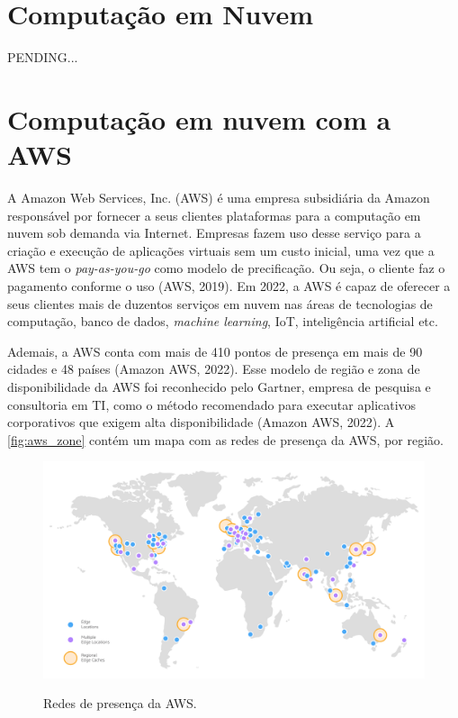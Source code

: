 \section{Computação em Nuvem}

PENDING...

\section{Computação em nuvem com a AWS}

A Amazon Web Services, Inc. (AWS) é uma empresa subsidiária da Amazon responsável por fornecer a seus clientes plataformas para a computação em nuvem sob demanda via Internet. Empresas fazem uso desse serviço para a criação e execução de aplicações virtuais sem um custo inicial, uma vez que a AWS tem o \textit{pay-as-you-go} como modelo de precificação. Ou seja, o cliente faz o pagamento conforme o uso (AWS, 2019). Em 2022, a AWS é capaz de oferecer a seus clientes mais de duzentos serviços em nuvem nas áreas de tecnologias de computação, banco de dados, \textit{machine learning}, IoT, inteligência artificial etc.

Ademais, a AWS conta com mais de 410 pontos de presença em mais de 90 cidades e 48 países (Amazon AWS, 2022). Esse modelo de região e zona de disponibilidade da AWS foi reconhecido pelo Gartner, empresa de pesquisa e consultoria em TI, como o método recomendado para executar aplicativos corporativos que exigem alta disponibilidade (Amazon AWS, 2022). A \autoref{fig:aws_zone} contém um mapa com as redes de presença da AWS, por região.

\begin{figure}[htbp]
	\centering
	\caption{Redes de presença da AWS.}
	\includegraphics[scale=0.3]{Imagens/aws_zones.png}
	\label{fig:aws_zone}
\end{figure}

